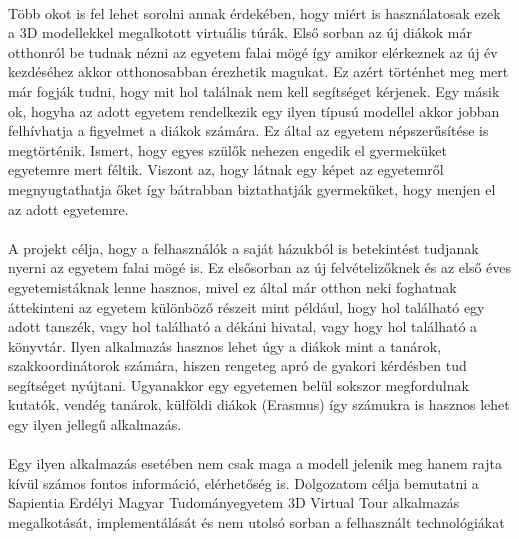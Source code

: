 \paragraph{}
Több okot is fel lehet sorolni annak érdekében, hogy miért is használatosak ezek a 3D modellekkel megalkotott virtuális túrák. Első sorban az új diákok már otthonról be tudnak nézni az egyetem falai mögé így amikor elérkeznek az új év kezdéséhez akkor otthonosabban érezhetik magukat. Ez azért történhet meg mert már fogják tudni, hogy mit hol találnak nem kell segítséget kérjenek. Egy másik ok, hogyha az adott egyetem rendelkezik egy ilyen típusú modellel akkor jobban felhívhatja a figyelmet a diákok számára. Ez által az egyetem népszerűsítése is megtörténik. Ismert, hogy egyes szülők nehezen engedik el gyermeküket egyetemre mert féltik. Viszont az, hogy látnak egy  képet az egyetemről megnyugtathatja őket így bátrabban biztathatják gyermeküket, hogy menjen el az adott egyetemre. 
\paragraph{}
A projekt célja, hogy a felhasználók a saját házukból is betekintést tudjanak nyerni az egyetem falai mögé is. Ez elsősorban az új felvételizőknek és az első éves egyetemistáknak lenne hasznos, mivel ez által már otthon neki foghatnak áttekinteni az egyetem különböző részeit mint például, hogy hol található egy adott tanszék, vagy hol található a dékáni hivatal, vagy hogy hol található a könyvtár. Ilyen alkalmazás hasznos lehet úgy a diákok mint a tanárok, szakkoordinátorok számára, hiszen rengeteg apró de gyakori kérdésben tud segítséget nyújtani. Ugyanakkor egy egyetemen belül sokszor megfordulnak kutatók, vendég tanárok, külföldi diákok (Erasmus) így számukra is hasznos lehet egy ilyen jellegű alkalmazás.
\paragraph{}
Egy ilyen alkalmazás esetében nem csak maga a modell jelenik meg hanem rajta kívül számos fontos információ, elérhetőség is. Dolgozatom célja bemutatni a Sapientia Erdélyi Magyar Tudományegyetem 3D Virtual Tour alkalmazás megalkotását, implementálását és nem utolsó sorban a felhasznált technológiákat


